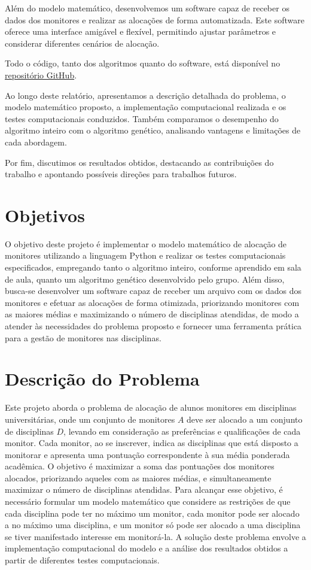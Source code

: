 \documentclass[a4paper,12pt]{article}
\begin{document}
Além do modelo matemático, desenvolvemos um software capaz de receber os dados dos monitores e realizar as alocações de forma automatizada. Este software oferece uma interface amigável e flexível, permitindo ajustar parâmetros e considerar diferentes cenários de alocação.

Todo o código, tanto dos algoritmos quanto do software, está disponível no \href{https://github.com/ethoshomo/scheduler-class-assistant}{repositório GitHub}.

Ao longo deste relatório, apresentamos a descrição detalhada do problema, o modelo matemático proposto, a implementação computacional realizada e os testes computacionais conduzidos. Também comparamos o desempenho do algoritmo inteiro com o algoritmo genético, analisando vantagens e limitações de cada abordagem.

Por fim, discutimos os resultados obtidos, destacando as contribuições do trabalho e apontando possíveis direções para trabalhos futuros.


\section{Objetivos}

O objetivo deste projeto é implementar o modelo matemático de alocação de monitores utilizando a linguagem Python e realizar os testes computacionais especificados, empregando tanto o algoritmo inteiro, conforme aprendido em sala de aula, quanto um algoritmo genético desenvolvido pelo grupo. Além disso, busca-se desenvolver um software capaz de receber um arquivo com os dados dos monitores e efetuar as alocações de forma otimizada, priorizando monitores com as maiores médias e maximizando o número de disciplinas atendidas, de modo a atender às necessidades do problema proposto e fornecer uma ferramenta prática para a gestão de monitores nas disciplinas.


\section{Descrição do Problema}

Este projeto aborda o problema de alocação de alunos monitores em disciplinas universitárias, onde um conjunto de monitores $A$ deve ser alocado a um conjunto de disciplinas $D$, levando em consideração as preferências e qualificações de cada monitor. Cada monitor, ao se inscrever, indica as disciplinas que está disposto a monitorar e apresenta uma pontuação correspondente à sua média ponderada acadêmica. O objetivo é maximizar a soma das pontuações dos monitores alocados, priorizando aqueles com as maiores médias, e simultaneamente maximizar o número de disciplinas atendidas. Para alcançar esse objetivo, é necessário formular um modelo matemático que considere as restrições de que cada disciplina pode ter no máximo um monitor, cada monitor pode ser alocado a no máximo uma disciplina, e um monitor só pode ser alocado a uma disciplina se tiver manifestado interesse em monitorá-la. A solução deste problema envolve a implementação computacional do modelo e a análise dos resultados obtidos a partir de diferentes testes computacionais.
\end{document}
